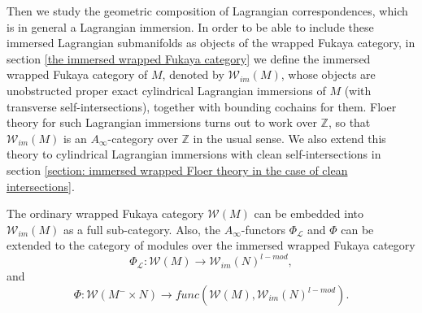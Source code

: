 \documentclass{amsart}
\numberwithin{equation}{section}
\numberwithin{figure}{section}
\begin{document}
	Then we study the geometric composition of Lagrangian correspondences, which is in general a Lagrangian immersion. In order to be able to include these immersed Lagrangian submanifolds as objects of the wrapped Fukaya category, in section \ref{the immersed wrapped Fukaya category} we define the immersed wrapped Fukaya category of $M$, denoted by $\mathcal{W}_{im}(M)$, whose objects are unobstructed proper exact cylindrical Lagrangian immersions of $M$ (with transverse self-intersections), together with bounding cochains for them. Floer theory for such Lagrangian immersions turns out to work over $\mathbb{Z}$, so that $\mathcal{W}_{im}(M)$ is an $A_{\infty}$-category over $\mathbb{Z}$ in the usual sense. We also extend this theory to cylindrical Lagrangian immersions with clean self-intersections in section \ref{section: immersed wrapped Floer theory in the case of clean intersections}. \par
	The ordinary wrapped Fukaya category $\mathcal{W}(M)$ can be embedded into $\mathcal{W}_{im}(M)$ as a full sub-category. Also, the $A_{\infty}$-functors $\Phi_{\mathcal{L}}$ and $\Phi$ can be extended to the category of modules over the immersed wrapped Fukaya category
\begin{equation}
\Phi_{\mathcal{L}}: \mathcal{W}(M) \to \mathcal{W}_{im}(N)^{l-mod},
\end{equation}
and
\begin{equation}
\Phi: \mathcal{W}(M^{-} \times N) \to func(\mathcal{W}(M), \mathcal{W}_{im}(N)^{l-mod}).
\end{equation} \par
\end{document}
